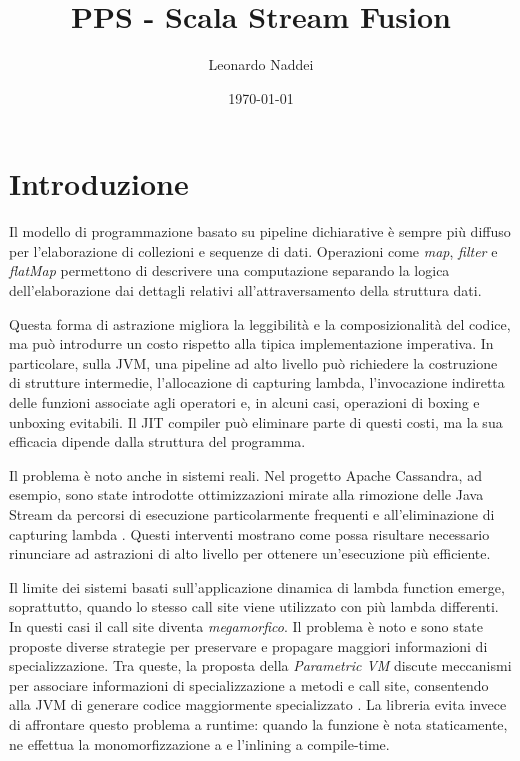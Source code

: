 \documentclass[a4paper,11pt]{report}
\title{PPS - Scala Stream Fusion}
\author{Leonardo Naddei}
\date{\today}
\theoremstyle{definition}
\begin{document}
\maketitle

\newpage

\tableofcontents

\newpage

\chapter{Introduzione}
\label{chap:introduzione}

Il modello di programmazione basato su pipeline dichiarative è sempre più diffuso per l'elaborazione di collezioni e sequenze di dati. Operazioni come \textit{map}, \textit{filter} e \textit{flatMap} permettono di descrivere una computazione separando la logica dell'elaborazione dai dettagli relativi all'attraversamento della struttura dati.

Questa forma di astrazione migliora la leggibilità e la composizionalità del codice, ma può introdurre un costo rispetto alla tipica implementazione imperativa. In particolare, sulla JVM, una pipeline ad alto livello può richiedere la costruzione di strutture intermedie, l'allocazione di capturing lambda, l'invocazione indiretta delle funzioni associate agli operatori e, in alcuni casi, operazioni di boxing e unboxing evitabili. Il JIT compiler può eliminare parte di questi costi, ma la sua efficacia dipende dalla struttura del programma.

Il problema è noto anche in sistemi reali. Nel progetto Apache Cassandra, ad esempio, sono state introdotte ottimizzazioni mirate alla rimozione delle Java Stream da percorsi di esecuzione particolarmente frequenti \cite{cassandra-stream-removal} e all'eliminazione di capturing lambda \cite{cassandra-lambda-removal}. Questi interventi mostrano come possa risultare necessario rinunciare ad astrazioni di alto livello per ottenere un'esecuzione più efficiente.

Il limite dei sistemi basati sull'applicazione dinamica di lambda function emerge, soprattutto, quando lo stesso call site viene utilizzato con più lambda differenti. In questi casi il call site diventa \textit{megamorfico}. Il problema è noto e sono state proposte diverse strategie per preservare e propagare maggiori informazioni di specializzazione. Tra queste, la proposta della \emph{Parametric VM} discute meccanismi per associare informazioni di specializzazione a metodi e call site, consentendo alla JVM di generare codice maggiormente specializzato \cite{rose-parametric-vm}. La libreria evita invece di affrontare questo problema a runtime: quando la funzione è nota staticamente, ne effettua la monomorfizzazione a e l'inlining a compile-time.
\end{document}
